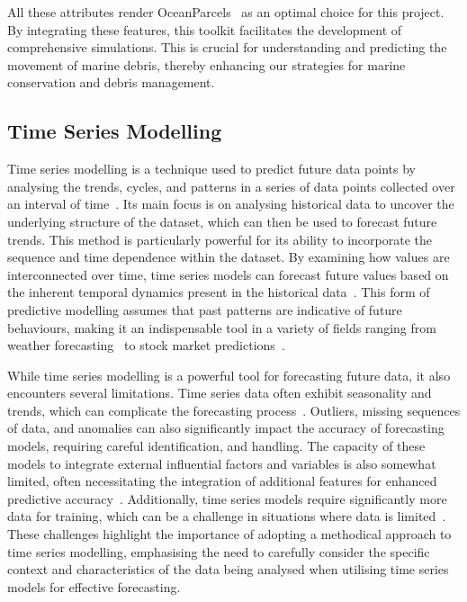 All these attributes render OceanParcels~\cite{20} as an optimal choice for this project. By integrating these features, this toolkit facilitates the development of comprehensive simulations. This is crucial for understanding and predicting the movement of marine debris, thereby enhancing our strategies for marine conservation and debris management.

\subsection{Time Series Modelling}
\label{subsec:2.1.4}
Time series modelling is a technique used to predict future data points by analysing the trends, cycles, and patterns in a series of data points collected over an interval of time~\cite{23}. Its main focus is on analysing historical data to uncover the underlying structure of the dataset, which can then be used to forecast future trends. This method is particularly powerful for its ability to incorporate the sequence and time dependence within the dataset. By examining how values are interconnected over time, time series models can forecast future values based on the inherent temporal dynamics present in the historical data~\cite{24}. This form of predictive modelling assumes that past patterns are indicative of future behaviours, making it an indispensable tool in a variety of fields ranging from weather forecasting~\cite{25} to stock market predictions~\cite{26}. 

While time series modelling is a powerful tool for forecasting future data, it also encounters several limitations. Time series data often exhibit seasonality and trends, which can complicate the forecasting process~\cite{27}. Outliers, missing sequences of data, and anomalies can also significantly impact the accuracy of forecasting models, requiring careful identification, and handling. The capacity of these models to integrate external influential factors and variables is also somewhat limited, often necessitating the integration of additional features for enhanced predictive accuracy~\cite{28}. Additionally, time series models require significantly more data for training, which can be a challenge in situations where data is limited~\cite{28}. These challenges highlight the importance of adopting a methodical approach to time series modelling, emphasising the need to carefully consider the specific context and characteristics of the data being analysed when utilising time series models for effective forecasting.

